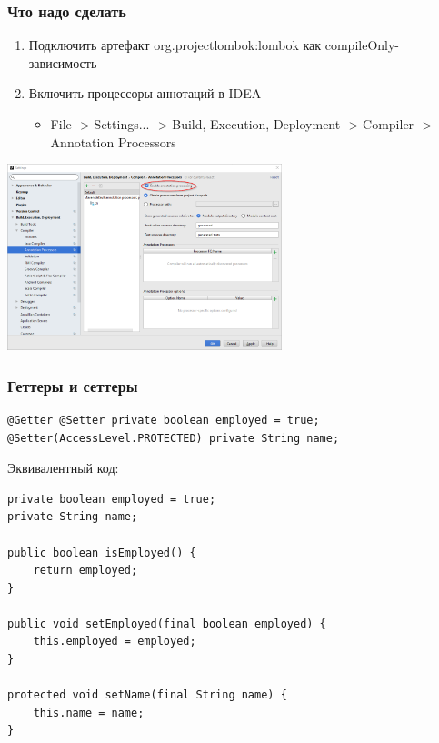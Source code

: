\documentclass[xetex,mathserif,serif]{beamer}
\begin{document}
	\begin{frame}
		\frametitle{Что надо сделать}
		\begin{enumerate}
			\item Подключить артефакт org.projectlombok:lombok как compileOnly-зависимость
			\item Включить процессоры аннотаций в IDEA
			\begin{itemize}
				\item File -> Settings... -> Build, Execution, Deployment -> Compiler -> Annotation Processors
			\end{itemize}
		\end{enumerate}
		\begin{center}
			\includegraphics[width=0.6\textwidth]{annotationProcessors.png}
		\end{center}
	\end{frame}

	\begin{frame}[fragile]
		\frametitle{Геттеры и сеттеры}
		\begin{footnotesize}
			\begin{verbatim}
@Getter @Setter private boolean employed = true;
@Setter(AccessLevel.PROTECTED) private String name;
		\end{verbatim}
		Эквивалентный код:
		\begin{verbatim}
private boolean employed = true;
private String name;

public boolean isEmployed() {
    return employed;
}

public void setEmployed(final boolean employed) {
    this.employed = employed;
}

protected void setName(final String name) {
    this.name = name;
}
			\end{verbatim}
		\end{footnotesize}
\end{frame}
\end{document}
